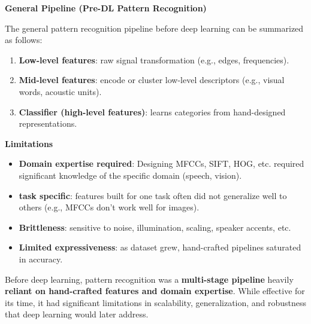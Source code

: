 \highspace
\begin{flushleft}
    \textcolor{Green3}{ \textbf{General Pipeline (Pre-DL Pattern Recognition)}}
\end{flushleft}
The general pattern recognition pipeline before deep learning can be summarized as follows:
\begin{enumerate}
    \item \textbf{Low-level features}: raw signal transformation (e.g., edges, frequencies).
    \item \textbf{Mid-level features}: encode or cluster low-level descriptors (e.g., visual words, acoustic units).
    \item \textbf{Classifier (high-level features)}: learns categories from hand-designed representations.
\end{enumerate}

\begin{flushleft}
    \textcolor{Red2}{ \textbf{Limitations}}
\end{flushleft}
\begin{itemize}
    \item \textbf{Domain expertise required}: Designing MFCCs, SIFT, HOG, etc. required significant knowledge of the specific domain (speech, vision).
    \item \textbf{task specific}: features built for one task often did not generalize well to others (e.g., MFCCs don't work well for images).
    \item \textbf{Brittleness}: sensitive to noise, illumination, scaling, speaker accents, etc. 
    \item \textbf{Limited expressiveness}: as dataset grew, hand-crafted pipelines saturated in accuracy.
\end{itemize}
Before deep learning, pattern recognition was a \textbf{multi-stage pipeline} heavily \textbf{reliant on hand-crafted features and domain expertise}. While effective for its time, it had significant limitations in scalability, generalization, and robustness that deep learning would later address.
